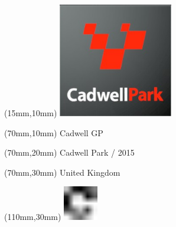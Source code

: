 \null\newpage
\begin{textblock*}{50mm}(15mm,10mm)%
\includegraphics[width=50mm]{LG/2015-05-20_00076.png}
\end{textblock*}
\begin{textblock*}{130mm}(70mm,10mm)%
{\fontsize{20}{20}\selectfont Cadwell GP}\\
\end{textblock*}
\begin{textblock*}{120mm}(70mm,20mm)%
{\fontsize{16}{16}\selectfont Cadwell Park / 2015}\\
\end{textblock*}
\begin{textblock*}{120mm}(70mm,30mm)%
{\fontsize{12}{12}\selectfont United Kingdom}
\end{textblock*}
\begin{textblock*}{30mm}(110mm,30mm)%
\centering
\includegraphics[height=15mm]{icons/fa-rotate-right.pdf}
\end{textblock*}
